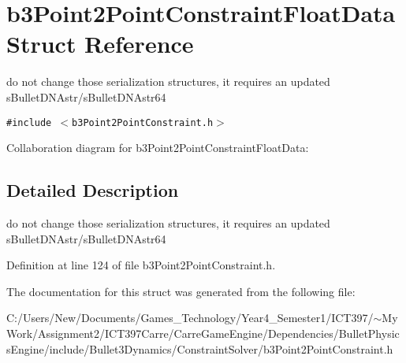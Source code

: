\hypertarget{structb3_point2_point_constraint_float_data}{
\section{b3Point2PointConstraintFloatData Struct Reference}
\label{structb3_point2_point_constraint_float_data}
}
do not change those serialization structures, it requires an updated sBulletDNAstr/sBulletDNAstr64  


{\tt \#include $<$b3Point2PointConstraint.h$>$}

Collaboration diagram for b3Point2PointConstraintFloatData:

\subsection{Detailed Description}
do not change those serialization structures, it requires an updated sBulletDNAstr/sBulletDNAstr64 

Definition at line 124 of file b3Point2PointConstraint.h.

The documentation for this struct was generated from the following file:\begin{CompactItemize}
\item 
C:/Users/New/Documents/Games\_\-Technology/Year4\_\-Semester1/ICT397/$\sim$My Work/Assignment2/ICT397Carre/CarreGameEngine/Dependencies/BulletPhysicsEngine/include/Bullet3Dynamics/ConstraintSolver/b3Point2PointConstraint.h\end{CompactItemize}
